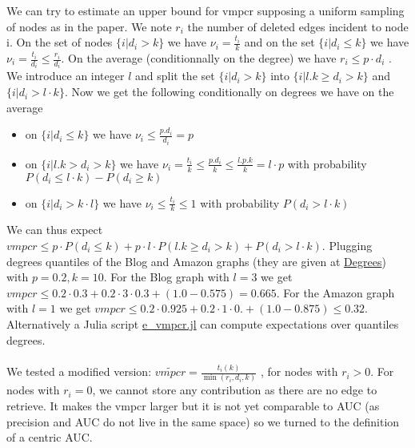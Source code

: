 \documentclass{article}
\begin{document}
We can try to estimate an upper bound for vmpcr supposing a uniform sampling of nodes as in the paper.
We note $r_{i}$ the number of deleted edges incident to node i.
On the set of nodes $\{i | d_{i} > k\}$ we have $ \nu_{i} = \frac{t_{i}}{k} $ and on the set $\{i | d_{i} \leq k\}$  we have  $ \nu_{i} = \frac{t_{i}}{d_{i}} \leq \frac{r_{i}}{d_{i}}$.
On the average (conditionnally on the degree) we have $ r_{i} \leq p \cdot d_{i} $ . We introduce an integer $l$ and split the set $ \{ i | d_{i} > k  \}$ into  $ \{ i | l . k \ge d_{i} > k  \}$ and $ \{ i |  d_{i} > l \cdot k \}$. Now we get the following conditionally on degrees we have on the average
\begin{itemize}
    \item  on $\{i | d_{i} \leq k\}$ we have $ \nu_{i} \leq \frac{p . d_{i}}{d_{i}} = p$
    \item on  $ \{ i | l . k > d_{i} > k  \}$ we have $ \nu_{i} = \frac{t_{i}}{k} \leq \frac{p.d_{i}}{k} \leq \frac{l.p.k}{k} = l \cdot p $ with probability $P(d_{i} \leq l \cdot k) - P(d_{i} \geq k)$
    \item on $\{i| d_{i} > k \cdot l \}$  we have $ \nu_{i} \leq \frac{t_{i}}{k} \leq 1 $ with probability $ P(d_{i} > l \cdot k) $
\end{itemize}

We can thus expect $ vmpcr \leq p \cdot P(d_{i} \leq k) + p \cdot l \cdot P(l . k \geq d_{i} > k ) + P(d_{i} > l \cdot k)$.
Plugging degrees quantiles of the Blog and Amazon graphs (they are given at  \href{https://github.com/jean-pierreBoth/LinkAuc}{\color{blue}Degrees})
with $p=0.2, k=10$. For the Blog graph with $l=3$ we get $vmpcr \leq  0.2 \cdot 0.3 + 0.2 \cdot 3 \cdot 0.3 + (1.0-0.575) = 0.665$.
For the Amazon graph with $l = 1$ we get $ vmpcr \leq 0.2 \cdot 0.925 + 0.2 \cdot 1 \cdot 0. + (1.0-0.875) \leq 0.32$.
Alternatively a Julia script \href{https://github.com/jean-pierreBoth/LinkAuc/Degrees/e\_vmpcr.jl}{\color{blue}e\_vmpcr.jl} can compute expectations over quantiles degrees.

\paragraph{}

We tested  a modified version: $ \widetilde{vmpcr} = \frac{t_{i}(k)}{\min(r_{i}, d_{i}, k)}$ , for nodes with $ r_{i} > 0 $. For nodes with $ r_{i} = 0 $, we cannot store any contribution as there are no edge to retrieve.
It makes the vmpcr larger but it is not yet comparable to AUC (as precision and AUC do not live in the same space) so we turned to the definition of a centric AUC.
\end{document}
